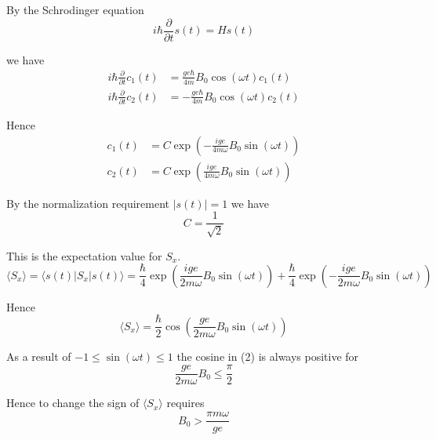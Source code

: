 By the Schrodinger equation
\begin{equation*}
i\hbar\frac{\partial}{\partial t}s(t)=Hs(t)
\end{equation*}

we have
\begin{align*}
i\hbar\frac{\partial}{\partial t}c_1(t)&=\frac{ge\hbar}{4m}B_0\cos(\omega t)c_1(t)
\\
i\hbar\frac{\partial}{\partial t}c_2(t)&=-\frac{ge\hbar}{4m}B_0\cos(\omega t)c_2(t)
\end{align*}

Hence
\begin{equation*}
\begin{aligned}
c_1(t)&=C\exp\left(-\frac{ige}{4m\omega}B_0\sin(\omega t)\right)
\\
c_2(t)&=C\exp\left(\frac{ige}{4m\omega}B_0\sin(\omega t)\right)
\end{aligned}
\tag{1}
\end{equation*}

By the normalization requirement $|s(t)|=1$ we have
\begin{equation*}
C=\frac{1}{\sqrt2}
\end{equation*}

\iffalse
In rectangular form
\begin{equation*}
\begin{aligned}
c_1(t)&=\frac{1}{\sqrt2}\cos\left(\frac{ge}{4m\omega}B_0\sin(\omega t)\right)
-\frac{i}{\sqrt2}\sin\left(\frac{ge}{4m\omega}B_0\sin(\omega t)\right)
\\
c_2(t)&=\frac{1}{\sqrt2}\cos\left(\frac{ge}{4m\omega}B_0\sin(\omega t)\right)
+\frac{i}{\sqrt2}\sin\left(\frac{ge}{4m\omega}B_0\sin(\omega t)\right)
\end{aligned}
\end{equation*}
\fi

This is the expectation value for $S_x$.
\begin{equation*}
\langle S_x\rangle=\langle s(t)|S_x|s(t)\rangle
=\frac{\hbar}{4}\exp\left(\frac{ige}{2m\omega}B_0\sin(\omega t)\right)
+\frac{\hbar}{4}\exp\left(-\frac{ige}{2m\omega}B_0\sin(\omega t)\right)
\end{equation*}

Hence
\begin{equation*}
\langle S_x\rangle=\frac{\hbar}{2}\cos\left(\frac{ge}{2m\omega}B_0\sin(\omega t)\right)
\tag{2}
\end{equation*}

As a result of $-1\le\sin(\omega t)\le1$ the cosine in (2) is always positive for
\begin{equation*}
\frac{ge}{2m\omega}B_0\le\frac{\pi}{2}
\end{equation*}

Hence to change the sign of $\langle S_x\rangle$ requires
\begin{equation*}
B_0>\frac{\pi m\omega}{ge}
\end{equation*}



